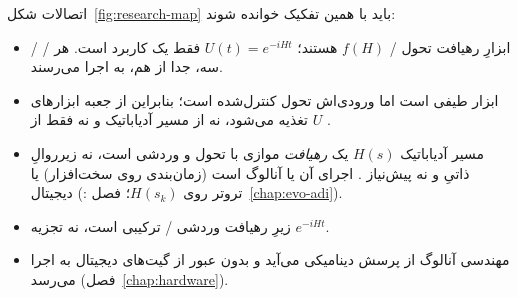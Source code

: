 اتصالات شکل~\ref{fig:research-map} باید با همین تفکیک خوانده شوند:
\begin{itemize}
	\item {} /  /  ابزارِ رهیافت تحول / $f(H)$ هستند؛ $U(t)=e^{-iHt}$ فقط یک کاربرد است. هر سه، جدا از هم، به اجرا می‌رسند.
	\item {} ابزار طیفی است اما ورودی‌اش تحول کنترل‌شده است؛ بنابراین از جعبه ابزارهای $U$ تغذیه می‌شود، نه از مسیر آدیاباتیک و نه فقط از .
	\item مسیر آدیاباتیک $H(s)$ یک \emph{رهیافت} موازی با تحول و وردشی است، نه زیرروالِ ذاتیِ  و نه پیش‌نیاز . اجرای آن یا آنالوگ است (زمان‌بندی روی سخت‌افزار) یا دیجیتال (: تروتر روی $H(s_k)$؛ فصل~\ref{chap:evo-adi}).
	\item {} زیرِ رهیافت وردشی / ترکیبی است، نه تجزیه $e^{-iHt}$.
	\item مهندسی آنالوگ از پرسش دینامیکی می‌آید و بدون عبور از گیت‌های دیجیتال به اجرا می‌رسد (فصل~\ref{chap:hardware}).
\end{itemize}


